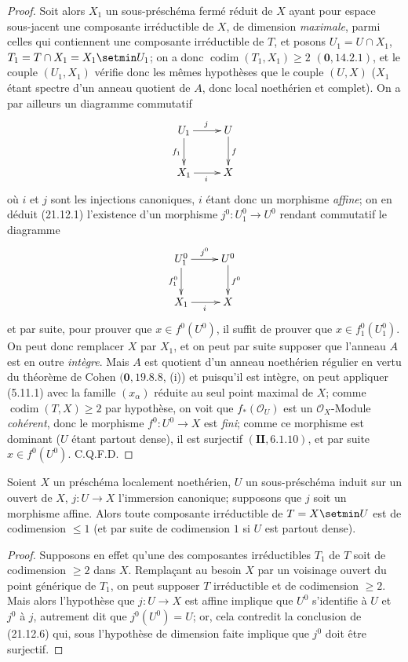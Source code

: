 \begin{proof}
Soit alors $X_1$ un sous-préschéma fermé réduit de $X$ ayant pour espace sous-jacent
une composante irréductible de $X$, de dimension \emph{maximale}, parmi celles qui
contiennent une composante irréductible de $T$, et posons
$U_1=U\cap X_1$, $T_1=T\cap X_1=X_1\setmin U_1$; on a donc
$\operatorname{codim}(T_1,X_1)\geq2$ $(\mathbf 0, 14.2.1)$, et le couple $(U_1,X_1)$
vérifie donc les mêmes hypothèses que le couple $(U,X)$ ($X_1$ étant spectre d'un
anneau quotient de $A$, donc local noethérien et complet). On a par ailleurs un
diagramme commutatif
\[
  \xymatrix{
    U_1 \ar[r]^j \ar[d]_{f_1} & U \ar[d]^f \\
    X_1 \ar[r]_i & X
  }
\]
où $i$ et $j$ sont les injections canoniques, $i$ étant donc un morphisme \emph{affine}; on en
déduit (21.12.1) l'existence d'un morphisme $j^0:U_1^0\to U^0$ rendant commutatif le
diagramme
\[
  \xymatrix{
    U_1^0 \ar[r]^{j^0} \ar[d]_{f_1^0} & U^0 \ar[d]^{f^0} \\
    X_1 \ar[r]_i & X
  }
\]
et par suite, pour prouver que $x\in f^0(U^0)$, il suffit de prouver que
$x\in f_1^0(U_1^0)$. On peut donc remplacer $X$ par $X_1$, et on peut par suite
supposer que l'anneau $A$ est en outre \emph{intègre}. Mais $A$ est quotient d'un
anneau noethérien régulier en vertu du théorème de Cohen $(\mathbf 0, 19.8.8$, (i)) et
puisqu'il est intègre, on peut appliquer (5.11.1) avec la famille $(x_\alpha)$ réduite au
seul point maximal de $X$; comme $\operatorname{codim}(T,X)\geq2$ par hypothèse, on
voit que $f_*(\mathcal O_U)$ est un $\mathcal O_X$-Module \emph{cohérent}, donc le
morphisme $f^0:U^0\to X$ est \emph{fini}; comme ce morphisme est dominant ($U$ étant partout
dense), il est surjectif $(\mathbf{II}, 6.1.10)$, et par suite $x\in f^0(U^0)$. C.Q.F.D.
\end{proof}

\begin{corollary}[21.12.7]
\label{IV.21.12.7}
Soient $X$ un préschéma localement noethérien, $U$ un sous-préschéma induit sur un
ouvert de $X$, $j:U\to X$ l'immersion canonique; supposons que $j$ soit un morphisme
\textup{affine}. Alors toute composante irréductible de $T=X\setmin U$ est de codimension $\leq1$
(et par suite de codimension $1$ si $U$ est partout dense).
\end{corollary}

\begin{proof}
Supposons en effet qu'une des composantes irréductibles $T_1$ de $T$ soit de
codimension $\geq2$ dans $X$. Remplaçant au besoin $X$ par un voisinage ouvert du
point générique de $T_1$, on peut supposer $T$ irréductible et de codimension $\geq2$.
Mais alors l'hypothèse
que $j:U\to X$ est affine implique que $U^0$ s'identifie à $U$ et $j^0$ à $j$,
autrement dit que $j^0(U^0)=U$; or, cela contredit la conclusion de (21.12.6) qui,
sous l'hypothèse de dimension faite implique que $j^0$ doit être surjectif.
\end{proof}

